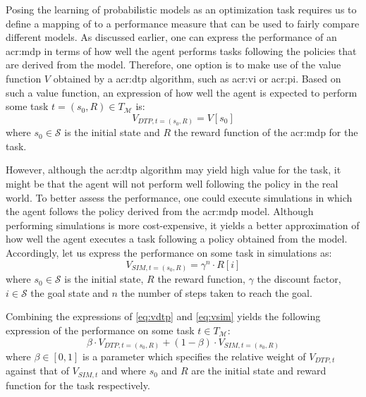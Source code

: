 Posing the learning of probabilistic models as an optimization task requires us to define a mapping of  to a performance measure that can be used to fairly compare different models.
As discussed earlier, one can express the performance of an \acrshort{acr:mdp} in terms of how well the agent performs tasks following the policies that are derived from the model.
Therefore, one option is to make use of the value function $V$ obtained by a \acrshort{acr:dtp} algorithm, such as \acrshort{acr:vi} or \acrshort{acr:pi}.
Based on such a value function, an expression of how well the agent is expected to perform some task $t = (s_0, R) \in T_\mathcal{M}$ is:
\begin{equation}
\label{eq:vdtp}
V_{\mathit{DTP}, t=(s_0, R)} = V[s_0]
\end{equation}
where $s_0 \in \mathcal{S}$ is the initial state and $R$ the reward function of the \acrshort{acr:mdp} for the task.

However, although the \acrshort{acr:dtp} algorithm may yield high value for the task, it might be that the agent will not perform well following the policy in the real world.
To better assess the performance, one could execute simulations in which the agent follows the policy derived from the \acrshort{acr:mdp} model.
Although performing simulations is more cost-expensive, it yields a better approximation of how well the agent executes a task following a policy obtained from the model.
Accordingly, let us express the performance on some task in simulations as:
\begin{equation}
\label{eq:vsim}
V_{\mathit{SIM}, t=(s_0, R)} = \gamma^{n} \cdot R[i]
\end{equation}
where $s_0 \in \mathcal{S}$ is the initial state, $R$ the reward function, $\gamma$ the discount factor, $i \in \mathcal{S}$ the goal state and $n$ the number of steps taken to reach the goal.

Combining the expressions of \autoref{eq:vdtp} and \autoref{eq:vsim} yields the following expression of the performance on some task $t \in T_\mathcal{M}$:
\begin{equation}
\label{eq:vcom}
\beta \cdot V_{\mathit{DTP}, t=(s_0, R)} + (1 - \beta) \cdot V_{\mathit{SIM}, t=(s_0, R)}
\end{equation}
where $\beta \in [0, 1]$ is a parameter which specifies the relative weight of $V_{\mathit{DTP}, t}$ against that of $V_{\mathit{SIM}, t}$ and where $s_0$ and $R$ are the initial state and reward function for the task respectively.

